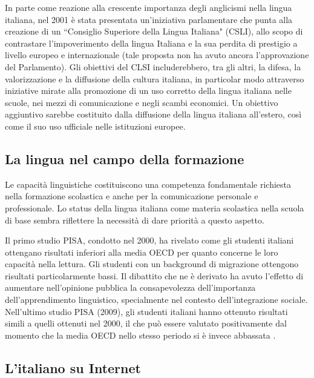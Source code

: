 \documentclass[]{../../metanetpaper}
\begin{document}
\begin{multicols}{2}

In parte come reazione alla crescente importanza degli anglicismi nella lingua
italiana, nel 2001 \`{e} stata presentata un'iniziativa parlamentare che punta
alla creazione di un “Consiglio Superiore della Lingua Italiana" (CSLI), allo
scopo di contrastare l'impoverimento della lingua Italiana e la sua perdita di
prestigio a livello europeo e internazionale (tale proposta non ha avuto
ancora l'approvazione del Parlamento). Gli obiettivi del CLSI includerebbero,
tra gli altri, la difesa, la valorizzazione e la diffusione della cultura
italiana, in particolar modo attraverso iniziative mirate alla promozione di
un uso corretto della lingua italiana nelle scuole, nei mezzi di comunicazione
e negli scambi economici. Un obiettivo aggiuntivo sarebbe costituito dalla
diffusione della lingua italiana all'estero, cos\`{i} come il suo uso
ufficiale nelle istituzioni europee.



\subsection{La lingua nel campo della formazione}

Le capacit\`{a} linguistiche costituiscono una competenza fondamentale
richiesta nella formazione scolastica e anche per la comunicazione personale e
professionale. Lo status della lingua italiana come materia scolastica nella
scuola di base sembra riflettere la necessit\`{a} di dare priorit\`{a} a
questo aspetto.




Il primo studio PISA, condotto nel 2000, ha rivelato come gli studenti
italiani ottengano risultati inferiori alla media OECD per quanto concerne le
loro capacit\`{a} nella lettura. Gli studenti con un background di migrazione
ottengono risultati particolarmente bassi. Il dibattito che ne \`{e} derivato
ha avuto l'effetto di aumentare nell'opinione pubblica la consapevolezza
dell'importanza dell'apprendimento linguistico, specialmente nel contesto
dell'integrazione sociale. Nell'ultimo studio PISA (2009), gli studenti
italiani hanno ottenuto risultati simili a quelli ottenuti nel 2000, il che
pu\`{o} essere valutato positivamente dal momento che la media OECD nello
stesso periodo si \`{e} invece abbassata \cite{Pisa1}.



\subsection{L'italiano su Internet}


\end{multicols}
\end{document}
